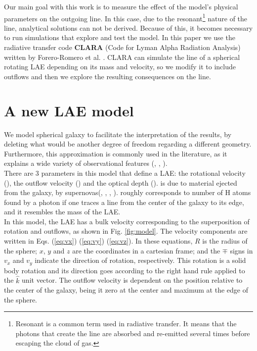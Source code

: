 \documentclass[twocolappendix]{latex/emulateapj}
\begin{document}
Our main goal with this work is to measure the effect of the model's
physical parameters on the outgoing \lya line. In this case, due to
the resonant\footnote{Resonant is a common term used in radiative
  transfer. It means that the photons that create the line are
  absorbed and re-emitted several times before escaping the cloud of
  gas.} nature of the \lya line, analytical solutions can not be
derived. Because of this, it becomes necessary to run simulations that
explore and test the model. In this paper we use the radiative
transfer code \textbf{CLARA} (Code for Lyman Alpha Radiation Analysis)
written by Forero-Romero et al. \cite{CLARA}. CLARA can simulate the
\lya line of a spherical rotating LAE depending on its mass and
velocity, so we modify it to include outflows and then we explore the
resulting consequences on the \lya line. \\


 

\section{A new LAE model}
\label{sec:newmodel}

We model spherical galaxy to facilitate the interpretation of the results, by deleting what would be another degree of freedom regarding a different geometry. Furthermore, this approximation is commonly used in the literature, as it explains a wide variety of observational features (\cite{Ahn03}, \cite{Verhamme06}, \cite{Dijkstra06}). \\

There are 3 parameters in this model that define a LAE: the rotational velocity (\vrot), the outflow velocity (\vout) and the optical depth (\tauh). \vout is due to material ejected from the galaxy, by supernovas(\cite{Verhamme06}, \cite{Orsi12}, \cite{Hashimoto2015}, \cite{Gronke2015}). \tauh roughly corresponds to number of H atoms found by a \lya photon if one traces a line from the center of the galaxy to its edge, and it resembles the mass of the LAE.\\

In this model, the LAE has a bulk velocity corresponding to the superposition of rotation and outflows, as shown in Fig. \ref{fig:model}. The velocity components are written in Eqs. (\ref{eq:vx}) (\ref{eq:vy}) (\ref{eq:vz}). In these equations, $R$ is the radius of the sphere; $x$, $y$ and $z$ are the coordinates in a cartesian frame; and the $\mp$ signs in $v_x$ and $v_y$ indicate the direction of rotation, respectively. This rotation is a solid body rotation and its direction goes according to the right hand rule applied to the $\hat{k}$ unit vector. The outflow velocity is dependent on the position relative to the center of the galaxy, being it zero at the center and maximum at the edge of the sphere.\\
\end{document}
